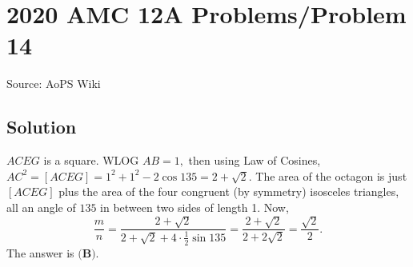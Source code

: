 \documentclass[12pt]{article}
\begin{document}
\section*{{2020 AMC 12A Problems/Problem 14}}
Source: AoPS Wiki

\subsection*{Solution}
$ACEG$ is a square. WLOG $AB = 1,$ then using Law of Cosines, $AC^2 = [ACEG] = 1^2 + 1^2 - 2 \cos{135} = 2 + \sqrt{2}.$ The area of the octagon is just $[ACEG]$ plus the area of the four congruent (by symmetry) isosceles triangles, all an angle of $135$ in between two sides of length 1. Now, \[\dfrac{m}{n} = \dfrac{2 + \sqrt{2}}{2 + \sqrt{2} + 4 \cdot \tfrac{1}{2} \sin{135}} = \dfrac{2 + \sqrt{2}}{2 + 2 \sqrt{2}} = \dfrac{\sqrt{2}}{2}.\] The answer is $\boxed{\textbf{(B)}}.$
\end{document}
